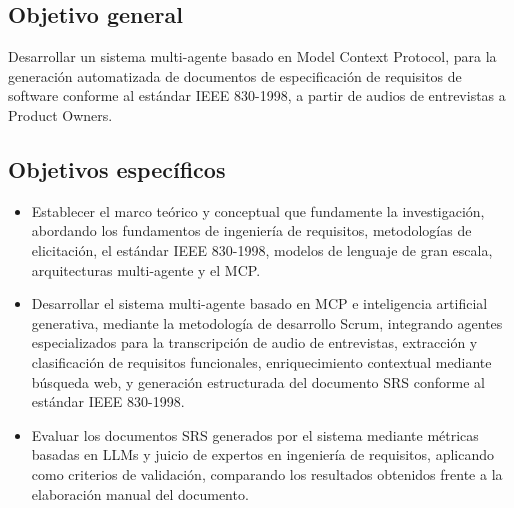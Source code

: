 

\subsection{Objetivo general}
Desarrollar un sistema multi-agente basado en Model Context Protocol, para la generación automatizada de documentos de especificación de requisitos de software conforme al estándar IEEE 830-1998, a partir de audios de entrevistas a Product Owners.

\subsection{Objetivos específicos}

\begin{itemize}
    \item Establecer el marco teórico y conceptual que fundamente la investigación, abordando los fundamentos de ingeniería de requisitos, metodologías de elicitación, el estándar IEEE 830-1998, modelos de lenguaje de gran escala, arquitecturas multi-agente y el MCP.
    
    \item Desarrollar el sistema multi-agente basado en MCP e inteligencia artificial generativa, mediante la metodología de desarrollo Scrum, integrando agentes especializados para la transcripción de audio de entrevistas, extracción y clasificación de requisitos funcionales, enriquecimiento contextual mediante búsqueda web, y generación estructurada del documento SRS conforme al estándar IEEE 830-1998.
    
    \item Evaluar los documentos SRS generados por el sistema mediante métricas basadas en LLMs y juicio de expertos en ingeniería de requisitos, aplicando como criterios de validación, comparando los resultados obtenidos frente a la elaboración manual del documento.
\end{itemize}


